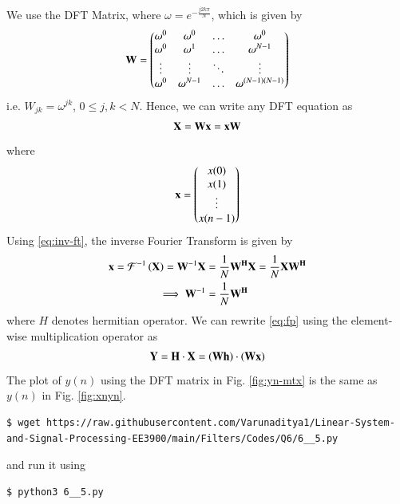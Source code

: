 \documentclass[journal,12pt,twocolumn]{IEEEtran}
\renewcommand\thesection{\arabic{section}}
\begin{document}
\begin{enumerate}[label=\thesection.\arabic*]
\solution
We use the DFT Matrix, where $\omega = e^{-\frac{j2k\pi}{N}}$, which is given by
\begin{align}
	\mathbf{W} = 
	\begin{pmatrix}
		\omega^0 & \omega^0 & \ldots & \omega^0 \\
		\omega^0 & \omega^1 & \ldots & \omega^{N - 1} \\
		\vdots & \vdots & \ddots & \vdots \\
		\omega^0 & \omega^{N - 1} & \ldots & \omega^{(N -1)(N - 1)}
	\end{pmatrix}
\end{align}
i.e. $W_{jk} = \omega^{jk}$, $0 \leq j, k < N$. Hence, we can write any DFT equation as
\begin{align}
	\mathbf{X} = \mathbf{W}\mathbf{x} = \mathbf{x}\mathbf{W}
\end{align}
\noindent where
\begin{align}
	\mathbf{x} = 
	\begin{pmatrix}
		x(0) \\ x(1) \\ \vdots \\ x(n - 1)
	\end{pmatrix}
\end{align}
\noindent Using \eqref{eq:inv-ft}, the inverse Fourier Transform is given by
\begin{align}
	\mathbf{x} = \mathcal{F}^{-1}\left(\mathbf{X}\right) = \mathbf{W}^{-1}\mathbf{X} &= 
	\frac{1}{N}\mathbf{W^{H}}\mathbf{X} = \frac{1}{N}\mathbf{X}\mathbf{W^{H}} \\ 
	\implies \mathbf{W}^{-1} &= \frac{1}{N}\mathbf{W^{H}}
\end{align}
\noindent where $H$ denotes hermitian operator. We can rewrite \eqref{eq:fp} using the
element-wise multiplication operator as
\begin{align}
	\mathbf{Y} = \mathbf{H}\cdot\mathbf{X} = \left(\mathbf{W}\mathbf{h}\right)\cdot\left(\mathbf{W}\mathbf{x}\right)
\end{align}
The plot of $y(n)$ using the DFT matrix in Fig. \eqref{fig:yn-mtx} is the same as $y(n)$ in 
Fig. \eqref{fig:xnyn}.
\begin{lstlisting}
$ wget https://raw.githubusercontent.com/Varunaditya1/Linear-System-and-Signal-Processing-EE3900/main/Filters/Codes/Q6/6__5.py
\end{lstlisting}
and run it using
\begin{lstlisting}
$ python3 6__5.py 
\end{lstlisting}


\end{enumerate}
\end{document}
